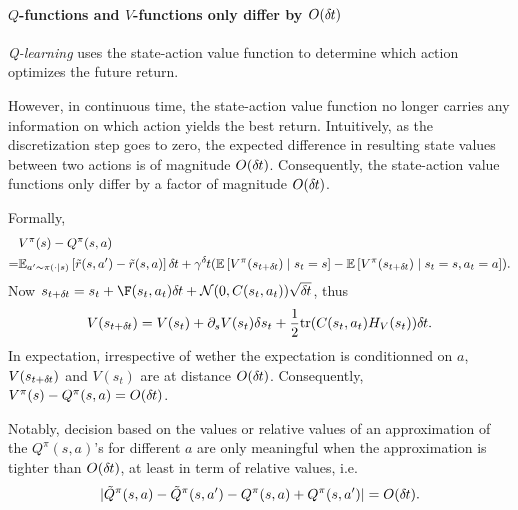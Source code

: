 
\paragraph{$Q$-functions and $V$-functions only differ by $O (\delta\hspace{-.06em}t)$}
\label{sec:QContinuous}
\emph{Q-learning} uses the state-action value function to determine which
action optimizes the future return.

However, in continuous time, the state-action value function no longer carries
any information on which action yields the best return. Intuitively, as the
discretization step goes to zero, the expected difference in resulting state
values between two actions is of magnitude $O (\delta\hspace{-.06em}t)$. Consequently, the
state-action value functions only differ by a factor of magnitude
$O (\delta\hspace{-.06em}t)$.

Formally,
\begin{align}
	&V^\pi(s) - Q^\pi(s, a)\\ 
	= &\BE_{a'\sim \pi(\cdot\mid s)}
	\left[\tilde{r}(s, a') - \tilde{r}(s, a)\right] \deltat
	+
	\gamma^\deltat 
	(\BE\left[V^\pi(s_{t+\deltat}) \mid s_t=s\right]
	-
	\BE\left[V^\pi(s_{t+\deltat}) \mid s_t=s, a_t=a\right]).\nonumber
\end{align}
Now $s_{t + \deltat} = s_t + \F(s_t, a_t) \deltat +
\gauss(0, C(s_t, a_t)) \sqrt{\deltat}$, thus 
\begin{equation}
	V(s_{t+\delta\hspace{-.06em}t}) = V(s_t) + \partial_s V(s_t) \delta s_t
	+ \frac{1}{2}\mathrm{tr}(C(s_t, a_t) H_V(s_t))\delta\hspace{-.06em}t.
\end{equation}
In expectation, irrespective of wether the expectation is conditionned on $a$,
$V(s_{t+\delta\hspace{-.06em}t})$ and $V(s_t)$ are at distance $O (\delta\hspace{-.06em}t)$. Consequently,
$V^\pi(s) - Q^\pi(s, a) = O (\delta\hspace{-.06em}t)$.

Notably, decision based on the values or relative values of an approximation of
the $Q^\pi(s, a)$'s for different $a$ are only meaningful when the
approximation is tighter than $O (\delta\hspace{-.06em}t)$, at least in term of relative
values, i.e.  
\begin{equation*}
	|\tilde{Q}^\pi(s, a) - \tilde{Q}^\pi(s, a') - Q^\pi(s, a) +
	Q^\pi(s, a')| = O (\delta\hspace{-.06em}t).
\end{equation*}

